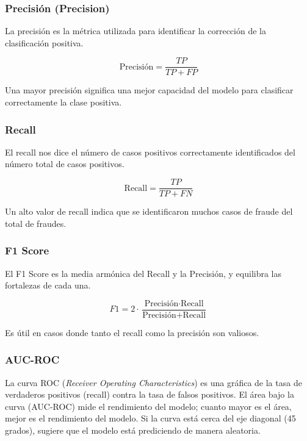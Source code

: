 \subsubsection{Precisión (Precision)}

La precisión es la métrica utilizada para identificar la corrección de la clasificación positiva.

\[
\text{Precisión} = \frac{TP}{TP + FP}
\]

Una mayor precisión significa una mejor capacidad del modelo para clasificar correctamente la clase positiva.

\subsubsection{Recall}

El recall nos dice el número de casos positivos correctamente identificados del número total de casos positivos.

\[
\text{Recall} = \frac{TP}{TP + FN}
\]

Un alto valor de recall indica que se identificaron muchos casos de fraude del total de fraudes.

\subsubsection{F1 Score}

El F1 Score es la media armónica del Recall y la Precisión, y equilibra las fortalezas de cada una.

\[
F1 = 2 \cdot \frac{\text{Precisión} \cdot \text{Recall}}{\text{Precisión} + \text{Recall}}
\]

Es útil en casos donde tanto el recall como la precisión son valiosos.

\subsubsection{AUC-ROC}

La curva ROC (\textit{Receiver Operating Characteristics}) es una gráfica de la tasa de verdaderos positivos (recall) contra la tasa de falsos positivos. El área bajo la curva (AUC-ROC) mide el rendimiento del modelo; cuanto mayor es el área, mejor es el rendimiento del modelo. Si la curva está cerca del eje diagonal (45 grados), sugiere que el modelo está prediciendo de manera aleatoria.

